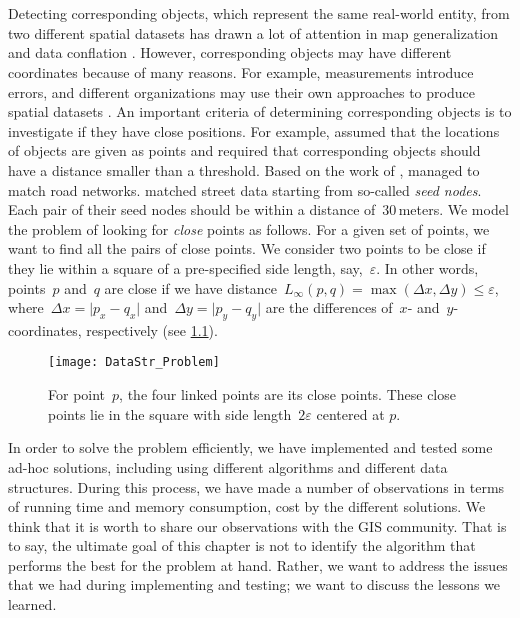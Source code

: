 \chapter[\DataStrToCTitle]{\DataStrTitle}
\label{chap:DataStr}

Detecting corresponding objects,
which represent the same real-world entity,
from two different spatial datasets
has drawn a lot of attention in map generalization 
\parencite[e.g.,][]{Noellenburg2008,Peng2016Admin,Deng2015}
and data conflation 
\parencite[e.g.,][]{Zhang2008Matching,Masuyama2006Tessellation,
	Tong2014Matching,Ruiz2011Conflation}.
However, corresponding objects may have different coordinates
because of many reasons.
For example, measurements introduce errors, 
and different organizations may use their own approaches 
to produce spatial datasets \parencite{Beeri2005}.
An important criteria of determining corresponding objects
is to investigate if they have close positions. 
For example, \textcite{Beeri2005} assumed that 
the locations of objects are given as points 
and required that corresponding objects should have a distance 
smaller than a threshold.
Based on the work of \textcite{Beeri2005}, 
\textcite{Safra2013} managed to match road networks.
\textcite{Volz2006} matched street data 
starting from so-called \emph{seed nodes}.
Each pair of their seed nodes should be 
within a distance of~$30\,$meters.
We model the problem of looking for 
\emph{close} points as follows.
For a given set of points,
we want to find all the pairs of close points. 
We consider two points to be close 
if they lie within a square of a pre-specified 
side length, say,~$\varepsilon$. 
In other words, points~$p$ and~$q$ are close 
if we have distance~$L_{\infty }(p,q)=\max (\Delta x,\Delta y)
\le \varepsilon$, where~$\Delta x=\vert p_{x}-q_{x}\vert$ 
and~$\Delta y=\vert p_{y}-q_{y}\vert$
are the differences of~$x$- and~$y$-coordinates, respectively
(see \fig\ref{fig:DataStr_Problem}).

\begin{figure}[tb]
\centering
\texttt{[image: DataStr\_Problem]}
\caption{For point~$p$, the four linked points are 
	its close points.
	These close points lie in the square 
	with side length~$2 \varepsilon$ centered at $p$.}
\label{fig:DataStr_Problem}
\end{figure}

In order to solve the problem efficiently,
we have implemented and tested some ad-hoc solutions,
including using different algorithms and different data structures.
During this process,
we have made a number of observations
in terms of running time and memory consumption,
cost by the different solutions.
We think that it is worth to share our observations
with the GIS community.
That is to say, the ultimate goal of this chapter 
is not to identify the algorithm 
that performs the best for the problem at hand. 
Rather, we want to address the issues 
that we had during implementing and testing; 
we want to discuss the lessons we learned.



